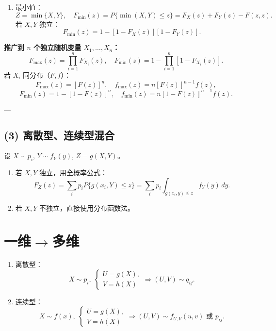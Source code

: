 \begin{enumerate}
\begin{enumerate}
                  \item 最小值：
                        $$
                              Z=\min\{X,Y\},\quad F_{\min}(z)=P\{\min(X,Y)\le z\}
                              =F_X(z)+F_Y(z)-F(z,z).
                        $$
                        若 $X,Y$ 独立：
                        $$
                              F_{\min}(z)=1-[1-F_X(z)][1-F_Y(z)].
                        $$
            \end{enumerate}

            \textbf{推广到 $n$ 个独立随机变量 $X_1,\dots,X_n$：}
            $$
                  F_{\max}(z)=\prod_{i=1}^n F_{X_i}(z),\quad
                  F_{\min}(z)=1-\prod_{i=1}^n[1-F_{X_i}(z)].
            $$
            若 $X_i$ 同分布（$F,f$）：
            $$
                  F_{\max}(z)=[F(z)]^n,\quad f_{\max}(z)=n[F(z)]^{n-1}f(z),
            $$
            $$
                  F_{\min}(z)=1-[1-F(z)]^n,\quad f_{\min}(z)=n[1-F(z)]^{n-1}f(z).
            $$
\end{enumerate}
---

\subsection*{(3) 离散型、连续型混合}
设 $X\sim p_i$, $Y\sim f_Y(y)$, $Z=g(X,Y)$。

\begin{enumerate}
      \item 若 $X,Y$ 独立，用全概率公式：
            $$
                  F_Z(z)=\sum_i p_i P\{g(x_i,Y)\le z\}=\sum_i p_i \int_{g(x_i,y)\le z} f_Y(y)\,dy.
            $$
      \item 若 $X,Y$ 不独立，直接使用分布函数法。
\end{enumerate}


\section{一维$\rightarrow$多维}

\begin{enumerate}
      \item 离散型：
            $$
                  X\sim p_i,\;
                  \begin{cases}U=g(X),\\V=h(X)\end{cases}
                  \Rightarrow (U,V)\sim q_{ij}.
            $$
      \item 连续型：
            $$
                  X\sim f(x),\;
                  \begin{cases}U=g(X),\\V=h(X)\end{cases}
                  \Rightarrow (U,V)\sim f_{U,V}(u,v)\text{ 或 }p_{ij}.
            $$
\end{enumerate}


